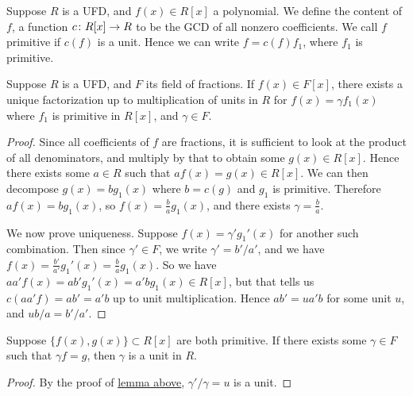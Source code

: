 \begin{definition}
    Suppose \(R\) is a UFD, and \(f(x) \in R[x]\) a polynomial.
    We define the content of \(f\), a function \(c\colon R[x]\to R\)
    to be the GCD of all nonzero coefficients.
    We call \(f\) primitive if \(c(f)\) is a unit.
    Hence we can write \(f = c(f)f_1\), where \(f_1\) is primitive.
\end{definition}
\begin{lemma}\label{lem:polynomial-primitive-decomp}
    Suppose \(R\) is a UFD, and \(F\) its field of fractions.
    If \(f(x) \in F[x]\),
    there exists a unique factorization up to multiplication of units in \(R\)
    for \(f(x) = \gamma f_1(x)\)
    where \(f_1\) is primitive in \(R[x]\), and \(\gamma \in F\).
\end{lemma}
\begin{proof}
    Since all coefficients of \(f\) are fractions,
    it is sufficient to look at the product of all denominators,
    and multiply by that to obtain some \(g(x) \in R[x]\).
    Hence there exists some \(a \in R\) such that \(af(x) = g(x) \in R[x]\).
    We can then decompose \(g(x) = bg_1(x)\)
    where \(b = c(g)\) and \(g_1\) is primitive.
    Therefore \(af(x) = bg_1(x)\),
    so \(f(x) = \frac{b}{a}g_1(x)\), and there exists \(\gamma = \frac{b}{a}\).

    We now prove uniqueness.
    Suppose \(f(x) = \gamma' g_1'(x)\) for another such combination.
    Then since \(\gamma' \in F\), we write \(\gamma' = b'/a'\),
    and we have \(f(x) = \frac{b'}{a'}g_1'(x) = \frac{b}{a}g_1(x)\).
    So we have \(aa'f(x) = ab'g_1'(x) = a'b g_1(x) \in R[x]\),
    but that tells us \(c(aa'f) = ab' = a'b\) up to unit multiplication.
    Hence \(ab' = ua'b\) for some unit \(u\),
    and \(ub/a = b'/a'\).
\end{proof}
\begin{corollary}\label{cor:polynomial-unit-mult}
    Suppose \(\{f(x),g(x)\} \subset R[x]\) are both primitive.
    If there exists some \(\gamma \in F\) such that \(\gamma f = g\),
    then \(\gamma\) is a unit in \(R\).
\end{corollary}
\begin{proof}
    By the proof of \hyperref[lem:polynomial-primitive-decomp]{lemma above},
    \(\gamma'/\gamma = u\) is a unit.
\end{proof}

